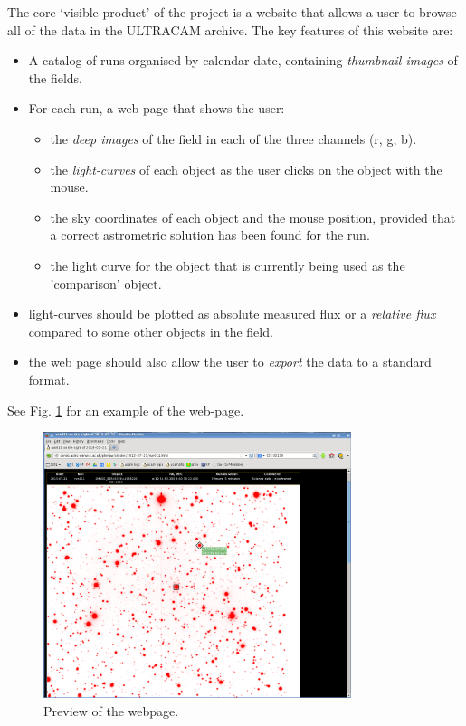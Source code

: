 The core `visible product' of the project is a website that allows a user to browse all of the data in the ULTRACAM archive. The key features of this website are:

\begin{itemize}
	\item A catalog of runs organised by calendar date, containing \emph{thumbnail images} of the fields.
	\item For each run, a web page that shows the user:
	\begin{itemize}
		\item the \emph{deep images} of the field in each of the three channels (r, g, b).
		\item the \emph{light-curves} of each object as the user clicks on the object with the mouse. 
		\item the sky coordinates of each object and the mouse position, provided that a correct astrometric solution has been found for the run. 
		\item the light curve for the object that is currently being used as the 'comparison' object. 
	\end{itemize}
	\item light-curves should be plotted as absolute measured flux or a \emph{relative flux} compared to some other objects in the field. 
	\item the web page should also allow the user to \emph{export} the data to a standard format.
	
\end{itemize}
See Fig. \ref{browser} for an example of the web-page. 

\begin{figure}[!h]
	\centering
	\includegraphics[width=90mm]{images/website1.png}
	\caption{Preview of the webpage.}
	\label{browser}
\end{figure}

